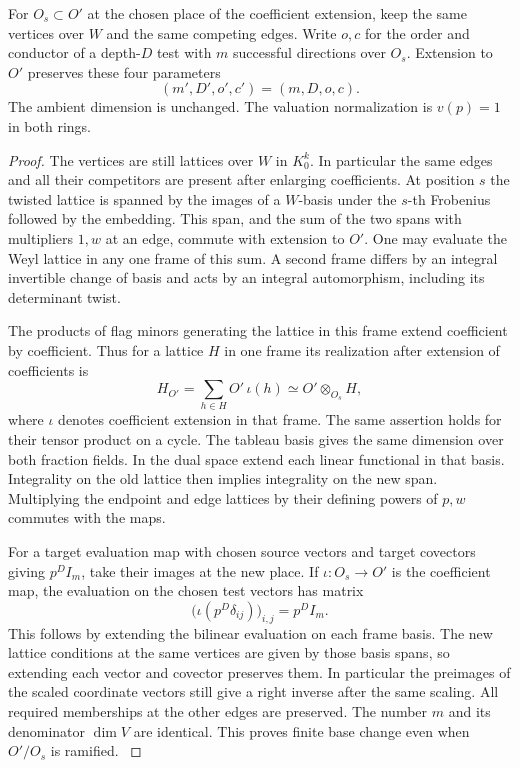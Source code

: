 \begin{lemma}\label{lem:edge-test-host-base-change}
For \(O_s\subset O'\) at the chosen place of the coefficient extension, keep the
same vertices over \(W\) and the same competing edges.
Write \(o,c\) for the order and conductor of a depth-\(D\) test with \(m\) successful directions over \(O_s\). Extension to \(O'\) preserves these four parameters
\[
 (m',D',o',c')=(m,D,o,c).
\]
 The ambient dimension is unchanged.
The valuation normalization is \(v(p)=1\) in both rings.
\end{lemma}

\begin{proof}
The vertices are still lattices over \(W\) in \(K_0^k\).
In particular the same edges and all their competitors are
present after enlarging coefficients. At position \(s\) the
twisted lattice is spanned by the images of a \(W\)-basis under
the \(s\)-th Frobenius followed by the embedding. This span,
and the sum of the two spans with multipliers \(1,w\) at an
edge, commute with extension to \(O'\). One may evaluate the
Weyl lattice in any one frame of this sum. A second frame
differs by an integral invertible change of basis and acts by
an integral automorphism, including its determinant twist.

The products of flag minors generating the lattice in this
frame extend coefficient by coefficient. Thus for a lattice \(H\) in one frame its realization after extension of coefficients is
\[
 H_{O'}=\sum_{h\in H}O'\,\iota(h)\simeq O'\otimes_{O_s}H,
\]
where \(\iota\) denotes coefficient extension in that frame.
The same assertion holds for their tensor product on a cycle.
The tableau basis gives the same dimension over both fraction
fields. In the dual space extend each linear functional in that
basis. Integrality on the old lattice then implies integrality
on the new span. Multiplying the endpoint and edge lattices by
their defining powers of \(p,w\) commutes with the maps.

For a target evaluation map with chosen source vectors and
target covectors giving \(p^D I_m\), take their images at the
new place. If \(\iota:O_s\to O'\) is the coefficient map, the evaluation on the chosen test vectors has matrix
\[
 \bigl(\iota(p^D\delta_{ij})\bigr)_{i,j}=p^D I_m.
\]
This follows by extending the bilinear evaluation on each frame basis. The new
lattice conditions at the same vertices are given by those
basis spans, so extending each vector and covector preserves
them. In particular the preimages of the scaled coordinate
vectors still give a right inverse after the same scaling. All required memberships at the
other edges are preserved. The number \(m\) and its denominator
\(\dim V\) are identical. This proves finite base change even
when \(O'/O_s\) is ramified.  \label{cor:host-edge-tests-1}

\end{proof}


